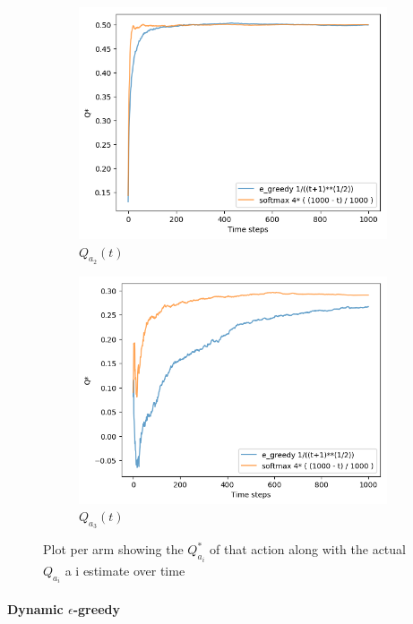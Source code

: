 \documentclass[letterpaper]{article}
\begin{document}
\begin{figure}[H]
\begin{subfigure}{.5\textwidth}
    \includegraphics[width=1\linewidth]{images/assign3/ex3/qta_2}
    \caption{$Q_{a_{2}}(t)$}
    \label{fig:qta_2_ex3}
  \end{subfigure}
  \begin{subfigure}{.5\textwidth}
    \centering
    \includegraphics[width=1\linewidth]{images/assign3/ex3/qta_3}
    \caption{$Q_{a_{3}}(t)$}
    \label{fig:qta_3_ex3}
  \end{subfigure}

    \caption{Plot per arm showing
    the $Q^{*}_{a_{i}}$
    of that action along with the actual $Q_{a_{i}}$ a i estimate over time}
    \label{fig:qtas_ex3}
\end{figure}

\paragraph{Dynamic $\epsilon$-greedy}
\end{document}
